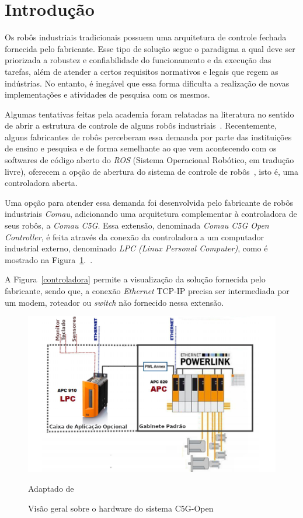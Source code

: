 \section{Introdução}
    Os robôs industriais tradicionais possuem uma arquitetura de controle fechada fornecida pelo fabricante. Esse tipo de solução segue o paradigma a qual deve ser priorizada a robustez e confiabilidade do funcionamento e da execução das tarefas, além de atender a certos requisitos normativos e legais que regem as indústrias. No entanto, é inegável que essa forma dificulta a realização de novas implementações e atividades de pesquisa com os mesmos.
    
    Algumas tentativas feitas pela academia foram relatadas na literatura no sentido de abrir a estrutura de controle de alguns robôs industriais~\citep{ROBERTI:2010}. Recentemente, alguns fabricantes de robôs perceberam essa demanda por parte das instituições de ensino e pesquisa e de forma semelhante ao que vem acontecendo com os softwares de código aberto do \textit{ROS} (Sistema Operacional Robótico, em tradução livre), oferecem a opção de abertura do sistema de controle de robôs~\citep{KUBUS:2010}, isto é, uma controladora aberta. 
    
    Uma opção para atender essa demanda foi desenvolvida pelo fabricante de robôs industriais \textit{Comau}, adicionando uma arquitetura complementar à controladora de seus robôs, a \textit{Comau C5G}. Essa extensão, denominada \textit{Comau C5G Open Controller}, é feita através da conexão da controladora a um computador industrial externo, denominado \textit{LPC (Linux Personal Computer)}, como é mostrado na Figura~\ref{controladora2}.~\citep{ANTONELLI:2010}.
    
    A Figura~\ref{controladora} permite a visualização da solução fornecida pelo fabricante, sendo que, a conexão \textit{Ethernet} TCP-IP precisa ser intermediada por um modem, roteador ou \textit{switch} não fornecido nessa extensão.
    \begin{figure}[ht]
        \centering
        \includegraphics[width=\columnwidth]{imagens/Conexoes/controladora2.png}
        \small 
        \centering 
        \caption{Visão geral sobre o hardware do sistema C5G-Open}
        Adaptado de~\citep{Ferrara:2013}
        \label{controladora2}
    \end{figure} 
    
